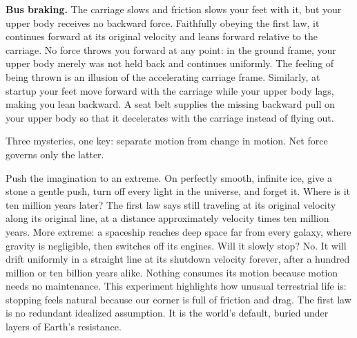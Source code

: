 \textbf{Bus braking.} The carriage slows and friction slows your feet with it, but your upper body receives no backward force. Faithfully obeying the first law, it continues forward at its original velocity and leans forward relative to the carriage. No force throws you forward at any point: in the ground frame, your upper body merely was not held back and continues uniformly. The feeling of being thrown is an illusion of the accelerating carriage frame. Similarly, at startup your feet move forward with the carriage while your upper body lags, making you lean backward. A seat belt supplies the missing backward pull on your upper body so that it decelerates with the carriage instead of flying out.

Three mysteries, one key: separate motion from change in motion. Net force governs only the latter.


\begin{thought}
Push the imagination to an extreme. On perfectly smooth, infinite ice, give a stone a gentle push, turn off every light in the universe, and forget it. Where is it ten million years later? The first law says still traveling at its original velocity along its original line, at a distance approximately velocity times ten million years. More extreme: a spaceship reaches deep space far from every galaxy, where gravity is negligible, then switches off its engines. Will it slowly stop? No. It will drift uniformly in a straight line at its shutdown velocity forever, after a hundred million or ten billion years alike. Nothing consumes its motion because motion needs no maintenance. This experiment highlights how unusual terrestrial life is: stopping feels natural because our corner is full of friction and drag. The first law is no redundant idealized assumption. It is the world's default, buried under layers of Earth's resistance.
\end{thought}

